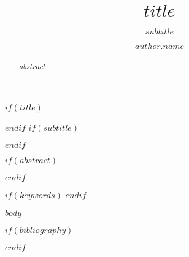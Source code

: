 \documentclass[manuscript,screen,review,anonymous]{acmart}
\author{$author.name$}
\affiliation{
		$if(author.institution)$
			\institution{$author.institution$}
		$endif$
		$if(author.department)$
			\institution{$author.department$}
		$endif$
		$if(author.city)$
			\city{$author.city$}
		$endif$
		$if(author.country)$
			\country{$author.country$}
		$endif$
	}
\begin{document}


$if(title)$
	\title{$title$}
$endif$
$if(subtitle)$
	\subtitle{$subtitle$}
$endif$


$if(abstract)$
\begin{abstract}
$abstract$
\end{abstract}
$endif$

\renewcommand{\shortauthors}{$shortauthors$}

\maketitle

$if(keywords)$
$endif$


$body$


$if(bibliography)$
  
	
$endif$
\end{document}
